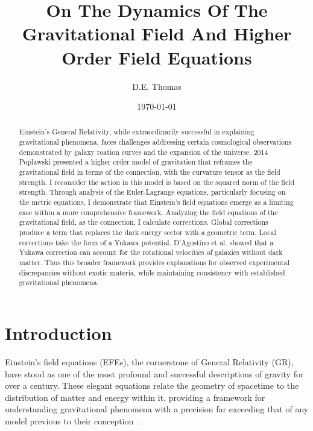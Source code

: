 \documentclass[aps,prd,preprint]{revtex4-1}
\begin{document}
\newcommand{\christoffel}[3]{
    \left\{ \begin{matrix} #1 \\ #2 #3 \end{matrix} \right\}
}

\title{On The Dynamics Of The Gravitational Field And Higher Order Field Equations}
\author{D.E. Thomas}
\date{\today}

\begin{abstract}
    Einstein's General Relativity, while extraordinarily successful in explaining gravitational phenomena, faces challenges addressing certain cosmological observations demonstrated by galaxy roation curves and the expansion of the universe. 2014 Poplawski presented a higher order model of gravitation that reframes the gravitational field in terms of the connection, with the curvature tensor as the field strength. I reconsider the action in this model is based on the squared norm of the field strength. Through analysis of the Euler-Lagrange equations, particularly focusing on the metric equations, I demonstrate that Einstein's field equations emerge as a limiting case within a more comprehensive framework. Analyzing the field equations of the gravitational field, as the connection, I calculate corrections. Global corrections produce a term that replaces the dark energy sector with a geometric term. Local corrections take the form of a Yukawa potential. D'Agostino et al. showed that a Yukawa correction can account for the rotational velocities of galaxies without dark matter. Thus this broader framework provides explanations for observed experimental discrepancies without exotic materia, while maintaining consistency with established gravitational phenomena.
\end{abstract}

\maketitle

\section*{Introduction}

Einstein's field equations (EFEs), the cornerstone of General Relativity (GR), have stood as one of the most profound and successful descriptions of gravity for over a century. These elegant equations relate the geometry of spacetime to the distribution of matter and energy within it, providing a framework for understanding gravitational phenomena with a precision far exceeding that of any model previous to their conception~\cite{Einstein_1916,misner_2017}.
\end{document}
